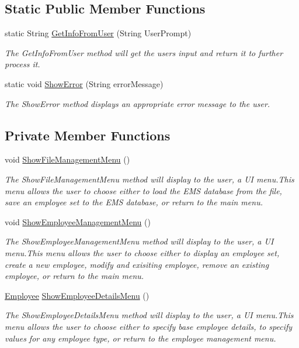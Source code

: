 \subsection*{Static Public Member Functions}
\begin{DoxyCompactItemize}
\item 
static String \hyperlink{class_presentation_1_1_u_i_menu_a501cb74c71850dc68b255ff502449031}{Get\+Info\+From\+User} (String User\+Prompt)
\begin{DoxyCompactList}\small\item\em The Get\+Info\+From\+User method will get the users input and return it to further process it. \end{DoxyCompactList}\item 
static void \hyperlink{class_presentation_1_1_u_i_menu_a8e46eecdb65e045345059e8a8a44c216}{Show\+Error} (String error\+Message)
\begin{DoxyCompactList}\small\item\em The Show\+Error method displays an appropriate error message to the user. \end{DoxyCompactList}\end{DoxyCompactItemize}
\subsection*{Private Member Functions}
\begin{DoxyCompactItemize}
\item 
void \hyperlink{class_presentation_1_1_u_i_menu_aae74bf481ca23465073a4fbe0b02ee42}{Show\+File\+Management\+Menu} ()
\begin{DoxyCompactList}\small\item\em The Show\+File\+Management\+Menu method will display to the user, a U\+I menu.\+This menu allows the user to choose either to load the E\+M\+S database from the file, save an employee set to the E\+M\+S database, or return to the main menu. \end{DoxyCompactList}\item 
void \hyperlink{class_presentation_1_1_u_i_menu_a2755275ac6f0b154a342ea70d2acf6d1}{Show\+Employee\+Management\+Menu} ()
\begin{DoxyCompactList}\small\item\em The Show\+Employee\+Management\+Menu method will display to the user, a U\+I menu.\+This menu allows the user to choose either to display an employee set, create a new employee, modify and exisiting employee, remove an existing employee, or return to the main menu. \end{DoxyCompactList}\item 
\hyperlink{class_all_employees_1_1_employee}{Employee} \hyperlink{class_presentation_1_1_u_i_menu_a5329c6b06713f4244fd897403993d7fb}{Show\+Employee\+Details\+Menu} ()
\begin{DoxyCompactList}\small\item\em The Show\+Employee\+Details\+Menu method will display to the user, a U\+I menu.\+This menu allows the user to choose either to specify base employee details, to specify values for any employee type, or return to the employee management menu. \end{DoxyCompactList}\end{DoxyCompactItemize}
